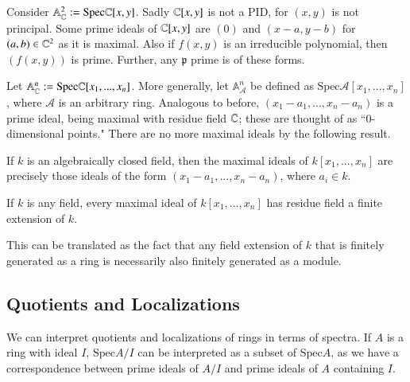 \begin{example}
    Consider $\mathbb{A}_{\mathbb C}^2 := \text{Spec}\mathbb C[x,y]$. Sadly $\mathbb C[x,y]$ is not a PID, for $(x,y)$ is not principal. Some prime ideals of $\mathbb C[x,y]$ are $(0)$ and $(x-a,y-b)$ for $(a,b) \in \mathbb C^2$ as it is maximal. Also if $f(x,y)$ is an irreducible polynomial, then $(f(x,y))$ is prime. Further, any $\mathfrak{p}$ prime is of these forms.
\end{example}

\begin{example}
    Let $\mathbb{A}_{\mathbb C}^n := \text{Spec}\mathbb C[x_1,...,x_n]$. More generally, let $\mathbb{A}_{\mathcal{A}}^n$ be defined as $\text{Spec}\mathcal{A}[x_1,...,x_n]$, where $\mathcal{A}$ is an arbitrary ring. Analogous to before, $(x_1-a_1,...,x_n-a_n)$ is a prime ideal, being maximal with residue field $\mathbb C$; these are thought of as ``$0$-dimensional points." There are no more maximal ideals by the following result.
\end{example}

\begin{theorem}
    If $k$ is an algebraically closed field, then the maximal ideals of $k[x_1,...,x_n]$ are precisely those ideals of the form $(x_1-a_1,...,x_n-a_n)$, where $a_i \in k$.
\end{theorem}


\begin{theorem}
    If $k$ is any field, every maximal ideal of $k[x_1,...,x_n]$ has residue field a finite extension of $k$.
\end{theorem}

This can be translated as the fact that any field extension of $k$ that is finitely generated as a ring is necessarily also finitely generated as a module.


\subsection{Quotients and Localizations}

We can interpret quotients and localizations of rings in terms of spectra. If $A$ is a ring with ideal $I$, $\text{Spec}A/I$ can be interpreted as a subset of $\text{Spec}A$, as we have a correspondence between prime ideals of $A/I$ and prime ideals of $A$ containing $I$.
